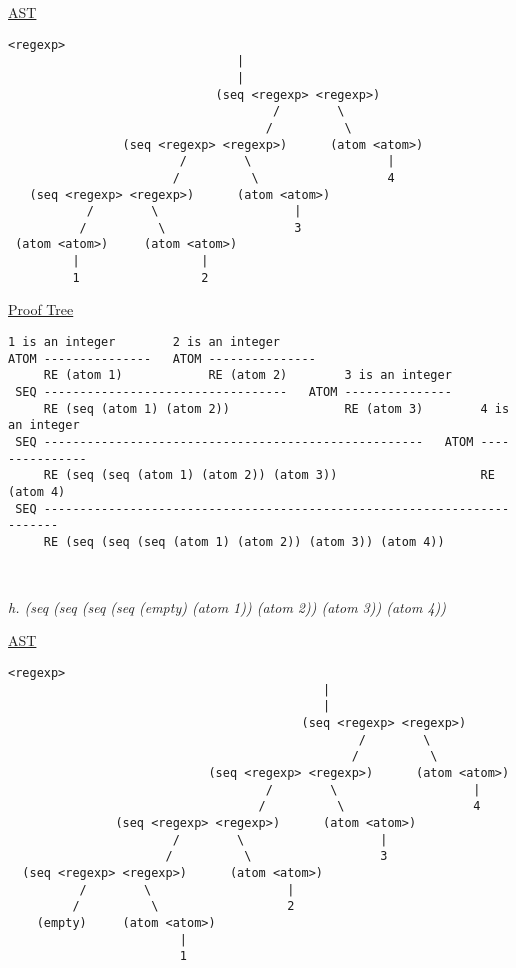 \documentclass{article}
\begin{document}
\underline{AST}
\begin{lstlisting}[language=vasu]
                            <regexp>
                                |
                                |
                             (seq <regexp> <regexp>)
                                     /        \
                                    /          \
                (seq <regexp> <regexp>)      (atom <atom>)
                        /        \                   |
                       /          \                  4
   (seq <regexp> <regexp>)      (atom <atom>)
           /        \                   |
          /          \                  3
 (atom <atom>)     (atom <atom>)
         |                 |
         1                 2

\end{lstlisting}

\underline{Proof Tree}
\begin{lstlisting}[language=vasu]
     1 is an integer        2 is an integer                   
ATOM ---------------   ATOM ---------------                              
     RE (atom 1)            RE (atom 2)        3 is an integer                    
 SEQ ----------------------------------   ATOM ---------------                            
     RE (seq (atom 1) (atom 2))                RE (atom 3)        4 is an integer                    
 SEQ -----------------------------------------------------   ATOM ---------------                              
     RE (seq (seq (atom 1) (atom 2)) (atom 3))                    RE (atom 4)                            
 SEQ ------------------------------------------------------------------------                                
     RE (seq (seq (seq (atom 1) (atom 2)) (atom 3)) (atom 4))                            
     
      
\end{lstlisting}
\newpage

\begin{quoting}
\textit{h. (seq (seq (seq (seq (empty) (atom 1)) (atom 2)) (atom 3)) (atom 4))}
\end{quoting}

\underline{AST}
\begin{lstlisting}[language=vasu]
                                        <regexp>
                                            |
                                            |
                                         (seq <regexp> <regexp>)
                                                 /        \
                                                /          \
                            (seq <regexp> <regexp>)      (atom <atom>)
                                    /        \                   |
                                   /          \                  4
               (seq <regexp> <regexp>)      (atom <atom>)
                       /        \                   |
                      /          \                  3
  (seq <regexp> <regexp>)      (atom <atom>)
          /        \                   |
         /          \                  2
    (empty)     (atom <atom>)
                        |
                        1

\end{lstlisting}
\end{document}
